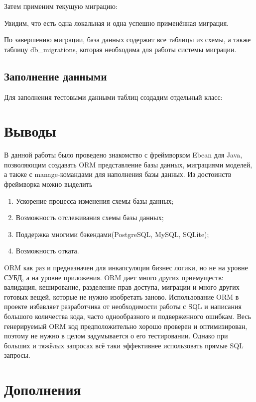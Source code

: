 \documentclass[a4paper]{article}
\begin{document}
Затем применим текущую миграцию:


Увидим, что есть одна локальная и одна успешно применённая миграция.



По завершению миграции, база данных содержит все таблицы из схемы, а также таблицу db\_migrations, которая необходима для работы системы миграции.


\subsection{Заполнение данными}
Для заполнения тестовыми данными таблиц создадим отдельный класс:


\section{Выводы}
В данной работы было проведено знакомство с фреймворком Ebean для Java, позволяющим создавать ORM представление базы данных, миграциями моделей, а также с manage-командами для наполнения базы данных. Из достоинств фреймворка можно выделить
\begin{enumerate}
	\item Ускорение процесса изменения схемы базы данных;
	\item Возможность отслеживания схемы базы данных;
	\item Поддержка многими бэкендами(PostgreSQL, MySQL, SQLite);
	\item Возможность отката.
\end{enumerate}

ORM как раз и предназначен для инкапсуляции бизнес логики, но не на уровне СУБД, а на уровне приложения.
ORM дает много других приемуществ: валидация, кеширование, разделение прав доступа, миграции и много других готовых вещей, которые не нужно изобретать заново.
Использование ORM в проекте избавляет разработчика от необходимости работы с SQL и написания большого количества кода, часто однообразного и подверженного ошибкам. Весь генерируемый ORM код предположительно хорошо проверен и оптимизирован, поэтому не нужно в целом задумывается о его тестировании.
Однако при больших и тяжёлых запросах всё таки эффективнее использовать прямые SQL запросы.

\section{Дополнения}











\end{document}
